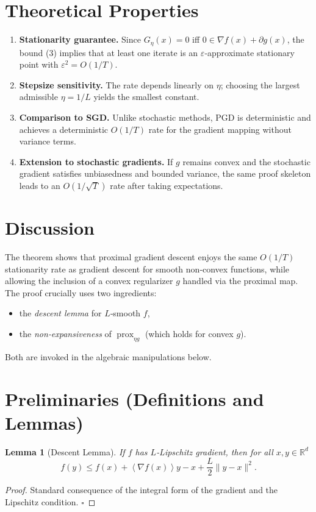\documentclass{article}
\newtheorem{lemma}{Lemma}
\newcommand{\prox}{\operatorname{prox}}
\newcommand{\grad}{\nabla}
\newcommand{\R}{\mathbb{R}}
\newcommand{\inner}[1]{\left\langle#1\right\rangle}
\begin{document}
\section*{Theoretical Properties}
\begin{enumerate}[noitemsep]
\item \textbf{Stationarity guarantee.} Since $G_{\eta}(x)=0$ iff $0\in\grad f(x)+\partial g(x)$, the bound (3) implies that at least one iterate is an $\varepsilon$‑approximate stationary point with $\varepsilon^{2}=O(1/T)$.
\item \textbf{Stepsize sensitivity.} The rate depends linearly on $\eta$; choosing the largest admissible $\eta=1/L$ yields the smallest constant.
\item \textbf{Comparison to SGD.} Unlike stochastic methods, PGD is deterministic and achieves a deterministic $O(1/T)$ rate for the gradient mapping without variance terms.
\item \textbf{Extension to stochastic gradients.} If $g$ remains convex and the stochastic gradient satisfies unbiasedness and bounded variance, the same proof skeleton leads to an $O(1/\sqrt{T})$ rate after taking expectations.
\end{enumerate}

\section*{Discussion}
The theorem shows that proximal gradient descent enjoys the same $O(1/T)$ stationarity rate as gradient descent for smooth non‑convex functions, while allowing the inclusion of a convex regularizer $g$ handled via the proximal map. The proof crucially uses two ingredients:
\begin{itemize}[noitemsep]
\item the \emph{descent lemma} for $L$‑smooth $f$,
\item the \emph{non‑expansiveness} of $\prox_{\eta g}$ (which holds for convex $g$).
\end{itemize}
Both are invoked in the algebraic manipulations below.

\newpage
\section*{Preliminaries (Definitions and Lemmas)}
\begin{lemma}[Descent Lemma]\label{lem:descent}
If $f$ has $L$‑Lipschitz gradient, then for all $x,y\in\R^{d}$
\[
f(y)\le f(x)+\inner{\grad f(x)}{y-x}+\frac{L}{2}\|y-x\|^{2}.
\tag{4}
\]
\end{lemma}
\begin{proof}
Standard consequence of the integral form of the gradient and the Lipschitz condition. \hfill $\square$
\end{proof}
\end{document}
